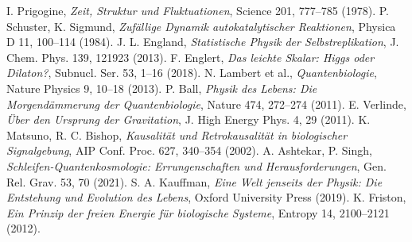 \documentclass[12pt,a4paper]{article}
\begin{document}
\begin{thebibliography}{99}
		 I. Prigogine, \textit{Zeit, Struktur und Fluktuationen}, Science 201, 777--785 (1978).
		 P. Schuster, K. Sigmund, \textit{Zufällige Dynamik autokatalytischer Reaktionen}, Physica D 11, 100--114 (1984).
		 J. L. England, \textit{Statistische Physik der Selbstreplikation}, J. Chem. Phys. 139, 121923 (2013).
		 F. Englert, \textit{Das leichte Skalar: Higgs oder Dilaton?}, Subnucl. Ser. 53, 1--16 (2018).
		 N. Lambert et al., \textit{Quantenbiologie}, Nature Physics 9, 10--18 (2013).
		 P. Ball, \textit{Physik des Lebens: Die Morgendämmerung der Quantenbiologie}, Nature 474, 272--274 (2011).
		 E. Verlinde, \textit{Über den Ursprung der Gravitation}, J. High Energy Phys. 4, 29 (2011).
		 K. Matsuno, R. C. Bishop, \textit{Kausalität und Retrokausalität in biologischer Signalgebung}, AIP Conf. Proc. 627, 340--354 (2002).
		 A. Ashtekar, P. Singh, \textit{Schleifen-Quantenkosmologie: Errungenschaften und Herausforderungen}, Gen. Rel. Grav. 53, 70 (2021).
		 S. A. Kauffman, \textit{Eine Welt jenseits der Physik: Die Entstehung und Evolution des Lebens}, Oxford University Press (2019).
		 K. Friston, \textit{Ein Prinzip der freien Energie für biologische Systeme}, Entropy 14, 2100--2121 (2012).
	\end{thebibliography}
\end{document}
